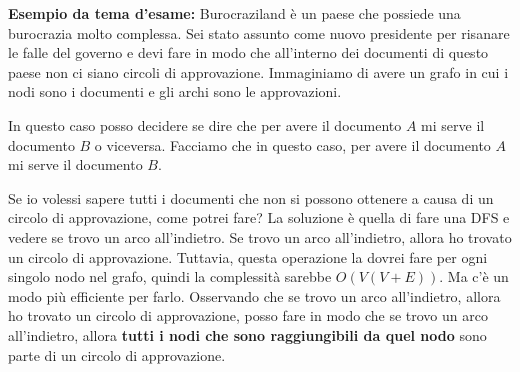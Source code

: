 \documentclass[a4paper]{article}
\begin{document}
\ex{}
{
  \textbf{Esempio da tema d'esame:}
  Burocraziland è un paese che possiede una burocrazia molto complessa. Sei stato assunto come nuovo presidente per risanare le falle
  del governo e devi fare in modo che all'interno dei documenti di questo paese non ci siano circoli di approvazione. 
  Immaginiamo di avere un grafo in cui i nodi sono i documenti e gli archi sono le approvazioni.
  \begin{figure}[H]
    \centering
  \end{figure}
  In questo caso posso decidere se dire che per avere il documento $A$ mi serve il documento $B$ o viceversa.
  Facciamo che in questo caso, per avere il documento $A$ mi serve il documento $B$.
  \begin{figure}[H]
    \centering
  \end{figure}
  Se io volessi sapere tutti i documenti che non si possono ottenere a causa di un circolo di approvazione, come potrei fare?
  La soluzione è quella di fare una DFS e vedere se trovo un arco all'indietro. Se trovo un arco all'indietro, allora ho trovato un circolo di approvazione.
  Tuttavia, questa operazione la dovrei fare per ogni singolo nodo nel grafo, quindi la complessità sarebbe $O(V(V + E))$.
  Ma c'è un modo più efficiente per farlo. Osservando che se trovo un arco all'indietro, allora ho trovato un circolo di approvazione, posso fare in modo che se trovo un arco all'indietro, allora \textbf{tutti i nodi che sono raggiungibili da quel nodo} sono parte di un circolo di approvazione.
}
\end{document}
